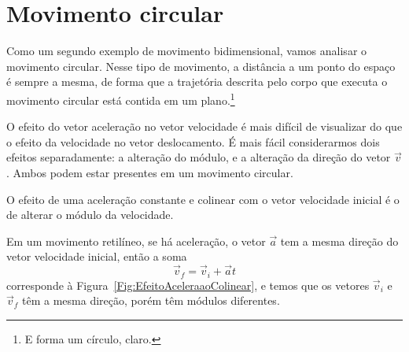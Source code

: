 \section{Movimento circular}
\label{Sec:MovimentoCircular}

Como um segundo exemplo de movimento bidimensional, vamos analisar o movimento circular. Nesse tipo de movimento, a distância a um ponto do espaço é sempre a mesma, de forma que a trajetória descrita pelo corpo que executa o movimento circular está contida em um plano.\footnote[][-1cm]{E forma um círculo, claro.}

O efeito do vetor aceleração no vetor velocidade é mais difícil de visualizar do que o efeito da velocidade no vetor deslocamento. É mais fácil considerarmos dois efeitos separadamente: a alteração do módulo, e a alteração da direção do vetor $\vec{v}$. Ambos podem estar presentes em um movimento circular.

\begin{marginfigure}[-1cm]
\centering
{}
\caption{O efeito de uma aceleração constante e colinear com o vetor velocidade inicial é o de alterar o módulo da velocidade.\label{Fig:EfeitoAceleraaoColinear}}
\end{marginfigure}

Em um movimento retilíneo, se há aceleração, o vetor $\vec{a}$ tem a mesma direção do vetor velocidade inicial, então a soma
\begin{equation}
    \vec{v}_f = \vec{v}_i + \vec{a} t
\end{equation}
%
corresponde à Figura~\ref{Fig:EfeitoAceleraaoColinear}, e temos que os vetores $\vec{v}_i$ e $\vec{v}_f$ têm a mesma direção, porém têm módulos diferentes.

